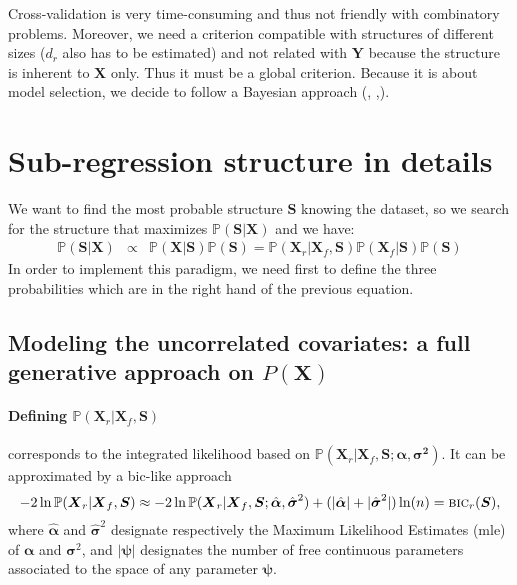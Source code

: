 \documentclass[12pt,a4paper]{report}
\begin{document}
Cross-validation is very time-consuming and thus not friendly with combinatory problems. Moreover, we need a criterion compatible with structures of different sizes ($d_r$ also has to be estimated) and not related with $\boldsymbol{Y}$ because the structure is inherent to $\boldsymbol{X}$ only. Thus it must be a global criterion. 	
Because it is about model selection, we decide to follow a Bayesian approach (\cite{raftery1995bayesian}, \cite{andrieu1999joint},\cite{chipman2001practical}).  
	

	

\section{Sub-regression structure in details}
We want to find the most probable structure $\boldsymbol{S}$ knowing the dataset, so we search for the structure that maximizes $\mathbb{P}(\boldsymbol{S}|\boldsymbol{X})$ and we have:	
	\begin{eqnarray}
	 \label{approxBIC} \mathbb{P}(\boldsymbol{S}|\boldsymbol{X})&\propto & \mathbb{P}(\boldsymbol{X}|\boldsymbol{S})\mathbb{P}(\boldsymbol{S})
	=\mathbb{P}(\boldsymbol{X}_r|\boldsymbol{X}_f,\boldsymbol{S})\mathbb{P}(\boldsymbol{X}_f|\boldsymbol{S})\mathbb{P}(\boldsymbol{S})
	\end{eqnarray}
In order to implement this paradigm, we need first to define the three probabilities which are in the right hand of the previous equation.
	\subsection{Modeling the uncorrelated covariates: a full generative approach on $P(\boldsymbol{X})$} \label{sectionfullgen}
	

\paragraph{Defining $\mathbb{P}(\boldsymbol{X}_r|\boldsymbol{X}_f,\boldsymbol{S})$} corresponds to the integrated likelihood based on $\mathbb{P}(\boldsymbol{X}_r | \boldsymbol{X}_f,\boldsymbol{S};\boldsymbol{\alpha},\boldsymbol{\sigma^2})$. It can be approximated by a {\sc bic}-like approach \cite{Sch1978}
\begin{equation}
-2\ln \mathbb{P}(\boldsymbol{X}_r|\boldsymbol{X}_f,\boldsymbol{S}) \approx -2\ln \mathbb{P}(\boldsymbol{X}_r | \boldsymbol{X}_f,\boldsymbol{S};\hat{\boldsymbol{\alpha}},\hat{\boldsymbol{\sigma}}^2) + (|\hat{\boldsymbol{\alpha}}| + |\hat{\boldsymbol{\sigma}}^2|) \ln(n) = \mbox{{\sc bic}}_r(\boldsymbol{S}),
\end{equation}
where $\hat{\boldsymbol{\alpha}}$ and $\hat{\boldsymbol{\sigma}}^2$ designate respectively the Maximum Likelihood Estimates ({\sc mle}) of ${\boldsymbol{\alpha}}$ and ${\boldsymbol{\sigma}}^2$, and $|\boldsymbol{\psi}|$ designates the number of free continuous parameters associated to the space of any parameter $\boldsymbol{\psi}$.
\end{document}
